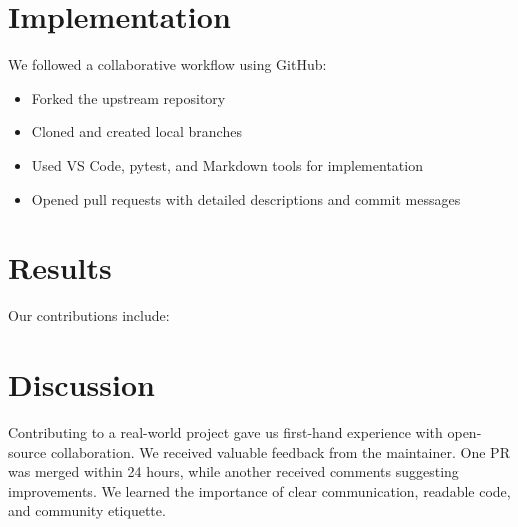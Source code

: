 \documentclass[12pt]{article}
\begin{document}
\section{Implementation}

We followed a collaborative workflow using GitHub:

\begin{itemize}
    \item Forked the upstream repository
    \item Cloned and created local branches
    \item Used VS Code, pytest, and Markdown tools for implementation
    \item Opened pull requests with detailed descriptions and commit messages
\end{itemize}

\section{Results}

Our contributions include:


\section{Discussion}

Contributing to a real-world project gave us first-hand experience with open-source collaboration. We received valuable feedback from the maintainer. One PR was merged within 24 hours, while another received comments suggesting improvements. We learned the importance of clear communication, readable code, and community etiquette.
\end{document}
